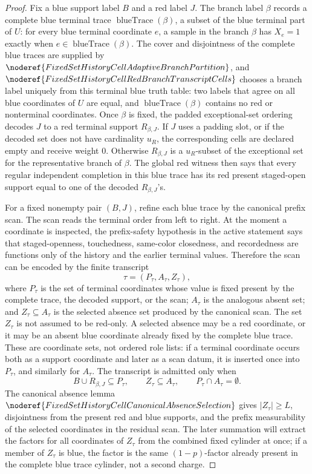 \begin{proof}
Fix a blue support label \(B\) and a red label \(J\).  The branch label
\(\beta\) records a complete blue terminal trace
\(\operatorname{blueTrace}(\beta)\), a subset of the blue terminal part of
\(U\): for every blue terminal coordinate \(e\), a sample in the branch
\(\beta\) has \(X_e=1\) exactly when
\(e\in\operatorname{blueTrace}(\beta)\).  The cover and disjointness of the
complete blue traces are supplied by
\(\noderef{FixedSetHistoryCellAdaptiveBranchPartition}\), and
\(\noderef{FixedSetHistoryCellRedBranchTranscriptCells}\) chooses a branch
label uniquely from this terminal blue truth table: two labels that agree on
all blue coordinates of \(U\) are equal, and
\(\operatorname{blueTrace}(\beta)\) contains no red or nonterminal
coordinates.  Once \(\beta\) is fixed, the padded exceptional-set ordering
decodes \(J\) to a red terminal support \(R_{\beta,J}\).  If \(J\) uses a
padding slot, or if the decoded set does not have cardinality \(u_R\), the
corresponding cells are declared empty and receive weight \(0\).  Otherwise
\(R_{\beta,J}\) is a \(u_R\)-subset of the exceptional set for the
representative branch of \(\beta\).  The global red witness then says that
every regular independent completion in this blue trace has its red present
staged-open support equal to one of the decoded \(R_{\beta,J}\)'s.

For a fixed nonempty pair \((B,J)\), refine each blue trace by the canonical
prefix scan.  The scan reads the terminal order from left to right.  At the
moment a coordinate is inspected, the prefix-safety hypothesis in the active
statement says that staged-openness, touchedness, same-color closedness, and
recordedness are functions only of the history and the earlier terminal
values.  Therefore the scan can be encoded by the finite transcript
\[
\tau=(P_\tau,A_\tau,Z_\tau),
\]
where \(P_\tau\) is the set of terminal coordinates whose value is fixed
present by the complete trace, the decoded support, or the scan; \(A_\tau\)
is the analogous absent set; and \(Z_\tau\subseteq A_\tau\) is the selected
absence set produced by the canonical scan.  The set \(Z_\tau\) is not
assumed to be red-only.  A selected absence may be a red coordinate, or it may
be an absent blue coordinate already fixed by the complete blue trace.  These
are coordinate sets, not ordered role lists: if a
terminal coordinate occurs both as a support coordinate and later as a scan
datum, it is inserted once into \(P_\tau\), and similarly for \(A_\tau\).
The transcript is admitted only when
\[
B\cup R_{\beta,J}\subseteq P_\tau,\qquad
Z_\tau\subseteq A_\tau,\qquad
P_\tau\cap A_\tau=\emptyset .
\]
The canonical absence lemma
\(\noderef{FixedSetHistoryCellCanonicalAbsenceSelection}\) gives
\(|Z_\tau|\ge L\), disjointness from the present red and blue supports, and
the prefix measurability of the selected coordinates in the residual scan.
The later summation will extract the factors for all coordinates of
\(Z_\tau\) from the combined fixed cylinder at once; if a member of
\(Z_\tau\) is blue, the factor is the same \((1-p)\)-factor already present
in the complete blue trace cylinder, not a second charge.


\end{proof}
